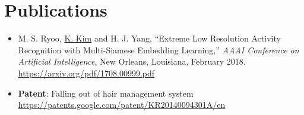 \documentclass[letterpaper,11pt]{article}
\makeatletter
\def \symbolcurrency {\textdollar}
\def \textcurrency {USD}
\def \rateWonCurrency {1122.90}
\def \dateCurrency {(Feb 23, 2019)}
\def \symbolcurrency {CHF\ }
\def \textcurrency {CHF}
\def \rateWonCurrency {1121.61}
\def \dateCurrency {(30 Jan, 2019)}
\def \symbolcurrency {\textdollar}
\def \textcurrency {CAD}
\def \rateWonCurrency {845.18}
\def \dateCurrency {(Dec 7, 2018)}
\def \symbolcurrency {\textsterling}
\def \textcurrency {GBP}
\def \rateWonCurrency {1450.36}
\def \dateCurrency {(19 Jan, 2019)}
\def \symbolcurrency {\texteuro}
\def \textcurrency {EUR}
\def \rateWonCurrency {1282.47}
\def \dateCurrency {(13 Dec, 2017)}
\newcommand{\resumeItem}[2]{
  \item\small{
    \textbf{#1}{: #2 \vspace{-2pt}}
  }
}
\newcommand{\resumeSimpleItem}[1]{
  \item\small{
    {#1 \vspace{-2pt}}
  }
}
\newcommand{\resumeSubheading}[4]{
  \vspace{-1pt}\item
    \begin{tabular*}{0.97\textwidth}{l@{\extracolsep{\fill}}r}
      \textbf{#1} & #2 \\
      \textit{\small#3} & \textit{\small #4} \\
    \end{tabular*}\vspace{-5pt}
}
\newcommand{\resumeSubHeadingListStart}{\begin{itemize}[leftmargin=*]}
\newcommand{\resumeSubHeadingListEnd}{\end{itemize}}
\newcommand{\resumeHeadItemListStart}{\begin{itemize}[leftmargin=*]}
\newcommand{\resumeHeadItemListEnd}{\end{itemize}\vspace{-5pt}}
\makeatother
\begin{document}


\section{Publications}
  \resumeHeadItemListStart
    \resumeSimpleItem
          {M. S. Ryoo, \underline{K. Kim} and H. J. Yang, ``Extreme Low Resolution Activity Recognition with Multi-Siamese Embedding Learning,'' \textit{AAAI Conference on Artificial Intelligence}, New Orleans, Louisiana, February 2018. \textit{{\color{acceptance}{[acceptance rate: 24.6\%]}}}\\
          \href{https://arxiv.org/pdf/1708.00999.pdf}{\underline{https://arxiv.org/pdf/1708.00999.pdf}}}
    \resumeItem{Patent}{Falling out of hair management system\\
                      \href{https://patents.google.com/patent/KR20140094301A/en}{\underline{https://patents.google.com/patent/KR20140094301A/en}}}
  \resumeHeadItemListEnd
\end{document}
